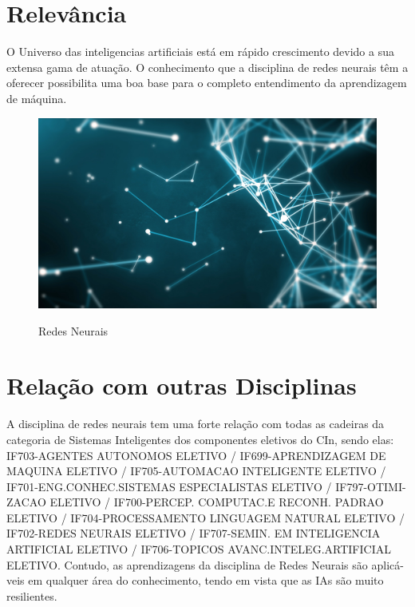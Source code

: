 \documentclass{article}
\begin{document}
\section{Relevância}
O Universo das inteligencias artificiais está em rápido crescimento
devido a sua extensa gama de atuação. O conhecimento que a disciplina de redes neurais têm a oferecer possibilita uma boa base para o completo entendimento da aprendizagem de máquina.


\begin{figure}[h!]
\centering
\includegraphics[scale=0.1]{redesneurais.jpg}
\caption{Redes Neurais}
\label{fig:redesneurais}
\citep{RedesNeurais2}
\end{figure}


\section{Relação com outras Disciplinas}
A disciplina de redes neurais tem uma forte relação com todas as cadeiras da categoria de Sistemas Inteligentes dos componentes eletivos do CIn, sendo elas: IF703-AGENTES AUTONOMOS ELETIVO
/ IF699-APRENDIZAGEM DE MAQUINA ELETIVO / IF705-AUTOMACAO INTELIGENTE ELETIVO / IF701-ENG.CONHEC.SISTEMAS ESPECIALISTAS ELETIVO / IF797-OTIMI- ZACAO ELETIVO / IF700-PERCEP. COMPUTAC.E RECONH. PADRAO ELETIVO / IF704-PROCESSAMENTO LINGUAGEM NATURAL ELETIVO / IF702-REDES NEURAIS ELETIVO / IF707-SEMIN. EM INTELIGENCIA ARTIFICIAL ELETIVO / IF706-TOPICOS AVANC.INTELEG.ARTIFICIAL ELETIVO. Contudo, as aprendizagens da disciplina de Redes Neurais são aplicá- veis em qualquer área do conhecimento, tendo em vista que as IAs são muito resilientes.




\end{document}
